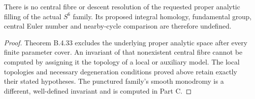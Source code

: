 \begin{corollary}\label{push:B51}
There is no central fibre or descent resolution
of the requested proper analytic filling of the
actual $S^6$ family. Its proposed integral homology,
fundamental group, central Euler number and
nearby-cycle comparison are therefore undefined.
\end{corollary}
\begin{proof}
Theorem B.4.33 excludes the underlying proper
analytic space after every finite parameter cover.
An invariant of that nonexistent central fibre
cannot be computed by assigning it the topology
of a local or auxiliary model. The local topologies
and necessary degeneration conditions proved above
retain exactly their stated hypotheses. The
punctured family's smooth monodromy is a different,
well-defined invariant and is computed in Part C.
\end{proof}
